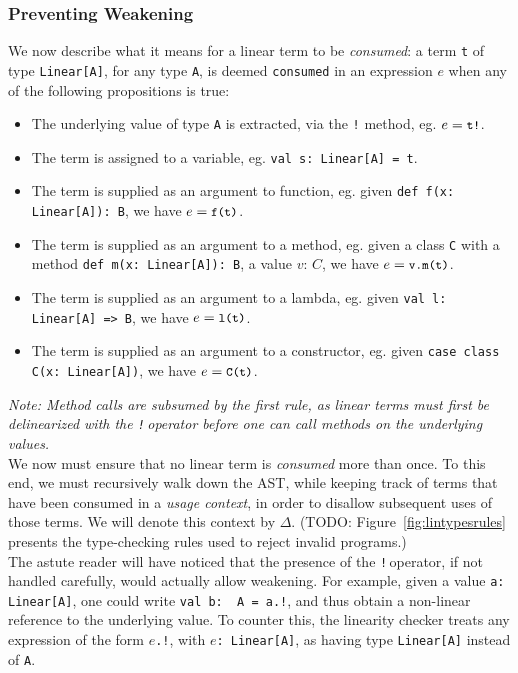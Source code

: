 \documentclass[a4paper,twoside]{article}
\newcommand{\TODO}[1]{\textcolor{YellowOrange}{(TODO: #1)}} %
\newcommand{\RefFig}[1]{Figure~\ref{#1}}
\newcommand{\stt}[1]{\texttt{\small{#1}}}
\begin{document}
\subsubsection{Preventing Weakening}

We now describe what it means for a linear term to be \textit{consumed}: a term \stt{t} of type \stt{Linear[A]}, for any type \stt{A}, is deemed \stt{consumed} in an expression $e$ when any of the following propositions is true:

\begin{itemize}
\item The underlying value of type \stt{A} is extracted, via the \stt{!} method, eg. $e = \stt{t!}$.
\item The term is assigned to a variable, eg. \stt{val s:\,Linear[A] = t}.
\item The term is supplied as an argument to function, eg. given \stt{def f(x:\,Linear[A]):\,B}, we have $e = \stt{f(t)}$.
\item The term is supplied as an argument to a method, eg. given a class \stt{C} with a method \stt{def m(x:\,Linear[A]):\,B}, a value $v:\, C$, we have $e = \stt{v.m(t)}$.
\item The term is supplied as an argument to a lambda, eg. given \stt{val l:\,Linear[A] => B}, we have $e = \stt{l(t)}$.
\item The term is supplied as an argument to a constructor, eg. given \stt{case class C(x: Linear[A])}, we have $e = \stt{C(t)}$.
\end{itemize}

\textit{Note: Method calls are subsumed by the first rule, as linear terms must first be delinearized with the \stt{!}\,operator before one can call methods on the underlying values.}\\

We now must ensure that no linear term is \textit{consumed} more than once. To this end, we must recursively walk down the AST, while keeping track of terms that have been consumed in a \textit{usage context}, in order to disallow subsequent uses of those terms. We will denote this context by $\Delta$. \TODO{\RefFig{fig:lintypesrules} presents the type-checking rules used to reject invalid programs.}\\

The astute reader will have noticed that the presence of the \stt{!}\,operator, if not handled carefully, would actually allow weakening. For example, given a value \stt{a:\,Linear[A]}, one could write \stt{val b:\, A = a.!}, and thus obtain a non-linear reference to the underlying value. To counter this, the linearity checker treats any expression of the form \stt{$e$.!}, with \stt{$e$:\,Linear[A]}, as having type \stt{Linear[A]} instead of \stt{A}.
\end{document}
